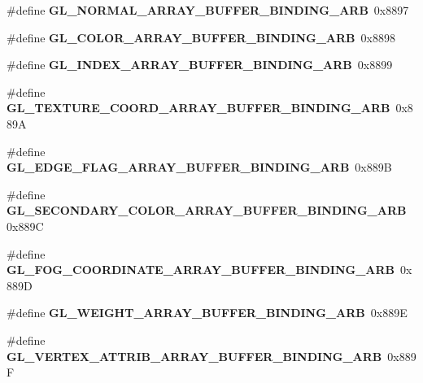 \begin{DoxyCompactItemize}
\item 
\#define {\bfseries G\+L\+\_\+\+N\+O\+R\+M\+A\+L\+\_\+\+A\+R\+R\+A\+Y\+\_\+\+B\+U\+F\+F\+E\+R\+\_\+\+B\+I\+N\+D\+I\+N\+G\+\_\+\+A\+R\+B}~0x8897\label{_s_d_l__opengl_8h_a62044a50ad83ae9df0b7a6bfc6f59909}

\item 
\#define {\bfseries G\+L\+\_\+\+C\+O\+L\+O\+R\+\_\+\+A\+R\+R\+A\+Y\+\_\+\+B\+U\+F\+F\+E\+R\+\_\+\+B\+I\+N\+D\+I\+N\+G\+\_\+\+A\+R\+B}~0x8898\label{_s_d_l__opengl_8h_ac582a701af66e598087965f9531bc30e}

\item 
\#define {\bfseries G\+L\+\_\+\+I\+N\+D\+E\+X\+\_\+\+A\+R\+R\+A\+Y\+\_\+\+B\+U\+F\+F\+E\+R\+\_\+\+B\+I\+N\+D\+I\+N\+G\+\_\+\+A\+R\+B}~0x8899\label{_s_d_l__opengl_8h_a46a562817d0b8da437857f523ce8ae3d}

\item 
\#define {\bfseries G\+L\+\_\+\+T\+E\+X\+T\+U\+R\+E\+\_\+\+C\+O\+O\+R\+D\+\_\+\+A\+R\+R\+A\+Y\+\_\+\+B\+U\+F\+F\+E\+R\+\_\+\+B\+I\+N\+D\+I\+N\+G\+\_\+\+A\+R\+B}~0x889\+A\label{_s_d_l__opengl_8h_a0280aa997eea1c697aae3e1d1e8aa8be}

\item 
\#define {\bfseries G\+L\+\_\+\+E\+D\+G\+E\+\_\+\+F\+L\+A\+G\+\_\+\+A\+R\+R\+A\+Y\+\_\+\+B\+U\+F\+F\+E\+R\+\_\+\+B\+I\+N\+D\+I\+N\+G\+\_\+\+A\+R\+B}~0x889\+B\label{_s_d_l__opengl_8h_aeb36fa5904fd28bfca696c4305bcbe14}

\item 
\#define {\bfseries G\+L\+\_\+\+S\+E\+C\+O\+N\+D\+A\+R\+Y\+\_\+\+C\+O\+L\+O\+R\+\_\+\+A\+R\+R\+A\+Y\+\_\+\+B\+U\+F\+F\+E\+R\+\_\+\+B\+I\+N\+D\+I\+N\+G\+\_\+\+A\+R\+B}~0x889\+C\label{_s_d_l__opengl_8h_a2a696fc689fa84f48d9ed7cb195695b0}

\item 
\#define {\bfseries G\+L\+\_\+\+F\+O\+G\+\_\+\+C\+O\+O\+R\+D\+I\+N\+A\+T\+E\+\_\+\+A\+R\+R\+A\+Y\+\_\+\+B\+U\+F\+F\+E\+R\+\_\+\+B\+I\+N\+D\+I\+N\+G\+\_\+\+A\+R\+B}~0x889\+D\label{_s_d_l__opengl_8h_a28ebc90da902b2a52b2fbf729eb9aba0}

\item 
\#define {\bfseries G\+L\+\_\+\+W\+E\+I\+G\+H\+T\+\_\+\+A\+R\+R\+A\+Y\+\_\+\+B\+U\+F\+F\+E\+R\+\_\+\+B\+I\+N\+D\+I\+N\+G\+\_\+\+A\+R\+B}~0x889\+E\label{_s_d_l__opengl_8h_a77ad736f6cf5a42926e5b55d2e7482f9}

\item 
\#define {\bfseries G\+L\+\_\+\+V\+E\+R\+T\+E\+X\+\_\+\+A\+T\+T\+R\+I\+B\+\_\+\+A\+R\+R\+A\+Y\+\_\+\+B\+U\+F\+F\+E\+R\+\_\+\+B\+I\+N\+D\+I\+N\+G\+\_\+\+A\+R\+B}~0x889\+F\label{_s_d_l__opengl_8h_a2edd2fc34f4005ad63607fec6c1aba3e}


\end{DoxyCompactItemize}
